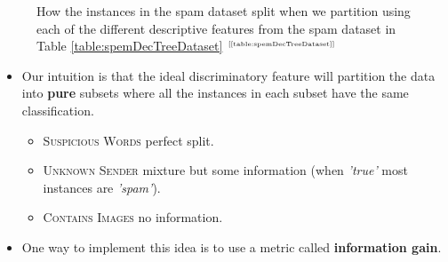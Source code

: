 \documentclass[xcolor={table}]{beamer}
\newcommand{\keyword}[1]{\alert{\textbf{#1}}\index{#1}}
\newcommand{\featN}[1]{\textsc{#1}}
\newcommand{\featL}[1]{\textit{'#1'}}
\newcommand{\ourRef}[1]{\ref{#1} $^{\text{\tiny[\pageref{#1}]}}$}
\begin{document}
 \begin{frame} 
\begin{figure}
	\centering
	\caption{How the instances in the spam dataset split when we partition using each of the different descriptive features from the spam dataset in Table \ourRef{table:spemDecTreeDataset}}
	\label{fig:spamhamfeaturesplits}
\end{figure}
\end{frame} 

\begin{frame}
	\begin{itemize}
		\item Our intuition is that the ideal discriminatory feature will partition the data into \textbf{pure} subsets where all the instances in each subset have the same classification. 
		\begin{itemize}
		\item \featN{Suspicious Words} perfect split. 
		\item \featN{Unknown Sender} mixture but some information (when \featL{true} most instances are \featL{spam}).
		\item \featN{Contains Images} no information.
		\end{itemize}
		\item One way to implement this idea is to use a metric called \keyword{information gain}. 
	\end{itemize}
\end{frame}
\end{document}
